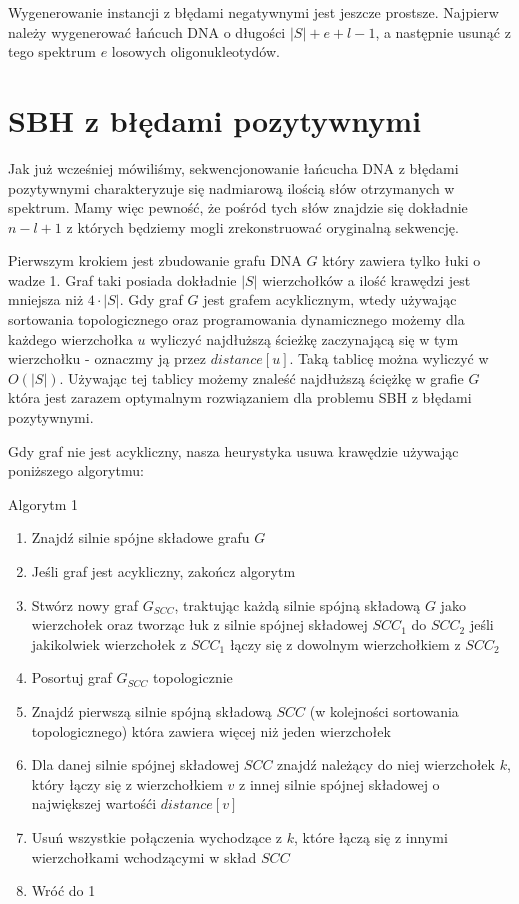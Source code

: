 \documentclass[a4paper,10pt]{article}
\begin{document}
Wygenerowanie instancji z błędami negatywnymi jest jeszcze prostsze. Najpierw należy
wygenerować łańcuch DNA o długości $|S|+e+l-1$, a następnie usunąć z tego spektrum
$e$ losowych oligonukleotydów.

\section{SBH z błędami pozytywnymi}
Jak już wcześniej mówiliśmy, sekwencjonowanie łańcucha DNA z błędami pozytywnymi charakteryzuje się
nadmiarową ilością słów otrzymanych w spektrum. Mamy więc pewność, że pośród tych słów znajdzie się dokładnie $n-l+1$ z których będziemy mogli zrekonstruować oryginalną sekwencję.

Pierwszym krokiem jest zbudowanie grafu DNA $G$ który zawiera tylko łuki o wadze 1. Graf taki posiada dokładnie $|S|$ wierzchołków a ilość krawędzi jest mniejsza niż $4 \cdot |S|$.
Gdy graf $G$ jest grafem acyklicznym, wtedy używając sortowania topologicznego oraz programowania dynamicznego możemy dla każdego wierzchołka $u$ wyliczyć 
najdłuższą ścieżkę zaczynającą się w tym wierzchołku - oznaczmy ją przez $distance[u]$. Taką tablicę można wyliczyć w $O(|S|)$. Używając tej tablicy 
możemy znaleść najdłuższą ściężkę w grafie $G$ która jest zarazem optymalnym rozwiązaniem dla problemu SBH z błędami pozytywnymi.

Gdy graf nie jest acykliczny, nasza heurystyka usuwa krawędzie używając poniższego algorytmu:

Algorytm 1
\begin{enumerate}
 \item Znajdź silnie spójne składowe grafu $G$
 \item Jeśli graf jest acykliczny, zakończ algorytm
 \item Stwórz nowy graf $G_{SCC}$, traktując każdą silnie spójną składową $G$ jako wierzchołek oraz
       tworząc łuk z silnie spójnej składowej $SCC_1$ do $SCC_2$ jeśli jakikolwiek wierzchołek z $SCC_1$ łączy się z dowolnym wierzchołkiem z $SCC_2$
 \item Posortuj graf $G_{SCC}$ topologicznie
 \item Znajdź pierwszą silnie spójną składową $SCC$ (w kolejności sortowania topologicznego) która zawiera więcej niż jeden wierzchołek
 \item Dla danej silnie spójnej składowej $SCC$ znajdź należący do niej wierzchołek $k$, który łączy się z wierzchołkiem $v$ z 
       innej silnie spójnej składowej o największej wartośći $distance[v]$
 \item Usuń wszystkie połączenia wychodzące z $k$, które łączą się z innymi wierzchołkami wchodzącymi w skład $SCC$
 \item Wróć do 1
\end{enumerate}
\end{document}
